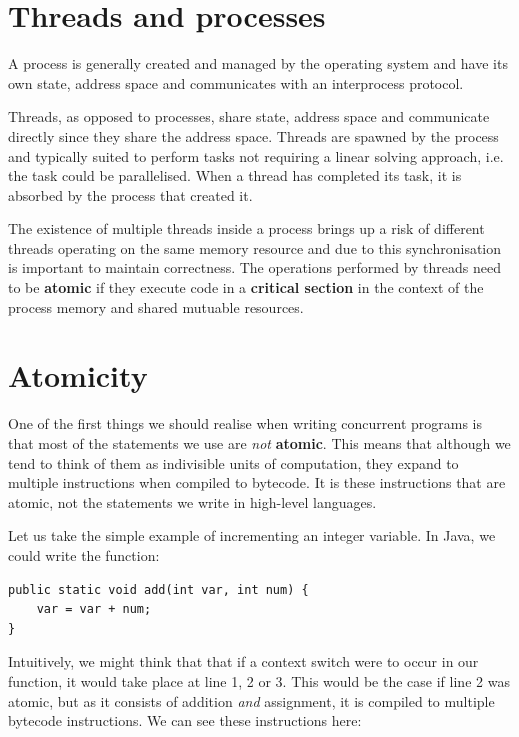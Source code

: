 \documentclass[a4paper,12pt]{kth-mag}
\begin{document}
\section{Threads and processes}
A process is generally created and managed by the operating system and have its own state, address space and communicates with an interprocess protocol.

Threads, as opposed to processes, share state, address space and communicate directly since they share the address space. Threads are spawned by the process and typically suited to perform tasks not requiring a linear solving approach, i.e. the task could be parallelised. When a thread has completed its task, it is absorbed by the process that created it.

The existence of multiple threads inside a process brings up a risk of different threads operating on the same memory resource and due to this synchronisation is important to maintain correctness. The operations performed by threads need to be \textbf{atomic} if they execute code in a \textbf{critical section} in the context of the process memory and shared mutuable resources.

\section{Atomicity}

One of the first things we should realise when writing concurrent programs is that most of the statements we use are \textit{not} \textbf{atomic}. This means that although we tend to think of them as indivisible units of computation, they expand to multiple instructions when compiled to bytecode. It is these instructions that are atomic, not the statements we write in high-level languages.

Let us take the simple example of incrementing an integer variable. In Java, we could write the function:

\begin{listing}[H]
\begin{verbatim}
public static void add(int var, int num) { 
	var = var + num; 
}
\end{verbatim}
\end{listing}

Intuitively, we might think that that if a context switch were to occur in our function, it would take place at line 1, 2 or 3. This would be the case if line 2 was atomic, but as it consists of addition \textit{and} assignment, it is compiled to multiple bytecode instructions. We can see these instructions here:
\end{document}
